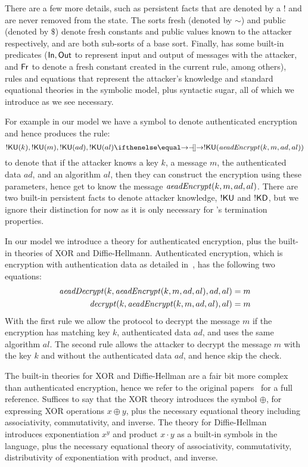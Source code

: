There are a few more details, such as persistent facts that are denoted by a $!$
and are never removed from the state.
%
The sorts fresh (denoted by $\sim$) and public (denoted by $\$$) denote fresh
constants and public values known to the attacker respectively, and are both
sub-sorts of a base sort.
%
Finally, \mTamarin has some built-in predicates ($\mathsf{In},
\mathsf{Out}$ to represent input and output of messages with the attacker,
and
$\mathsf{Fr}$ to denote a fresh constant created in the current rule, among
others), rules and equations that represent the attacker's knowledge
and standard equational theories in the symbolic model, plus syntactic
sugar, all of which we introduce as we see necessary.

For example in our model we have a symbol to denote authenticated encryption and
hence \mTamarin produces the rule:
%
\[ !\mKU( k ), !\mKU( m ), !\mKU( ad ), !\mKU( al ) \ifarrow !\mKU( \mAeadEncrypt(k, m, ad, al) ) \]
%
to denote that if the attacker knows a key $k$, a message
$m$, the authenticated data $ad$, and an algorithm
$al$, then they can construct the encryption using these parameters, hence get
to know the message $\mathit{aeadEncrypt}(k, m, ad, al)$.
%
There are two built-in persistent facts to denote attacker knowledge,
$!\mathsf{KU}$ and
$!\mathsf{KD}$, but we ignore their distinction for now as it is only necessary for
\mTamarin's termination properties.

In our model we introduce a theory for authenticated encryption, plus the
built-in theories of XOR and Diffie-Hellmann.
%
Authenticated encryption, which is encryption with authentication data as
detailed in~\cite{aead}, has the following two equations:
\begin{align*}
  \mathit{aeadDecrypt}(k, \mathit{aeadEncrypt}(k, m, ad, al), ad, al) = m\\
  \mathit{decrypt}(k, \mathit{aeadEncrypt}(k, m, ad, al), al) = m
\end{align*}
With the first rule we allow the protocol to decrypt the message $m$ if the
encryption has matching key $k$, authenticated data $ad$, and uses the same
algorithm $al$.
%
The second rule allows the attacker to decrypt the message $m$ with the key $k$
and without the authenticated data $ad$, and hence skip the check.

The built-in theories for XOR and Diffie-Hellman are a fair bit more complex
than authenticated encryption, hence we refer to the original
papers~\cite{xorTamarin,dhTamarin} for a full reference.
%
Suffices to say that the XOR theory introduces the symbol $\oplus$, for
expressing XOR operations $x \oplus y$, plus the necessary equational theory
including associativity, commutativity, and inverse.
%
The theory for Diffie-Hellman introduces exponentiation $x^y$ and product
$x \cdot y$ as a built-in symbols in the language, plus the necessary equational
theory of associativity, commutativity, distributivity of exponentiation with
product, and inverse.

